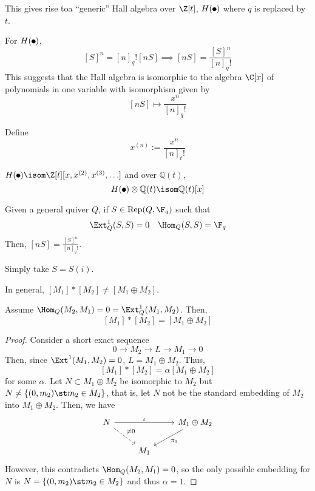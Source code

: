 \documentclass[11pt,leqno,oneside]{amsbook}
\numberwithin{thm}{section}
\newcommand{\Rep}{\operatorname{Rep}} %
\renewcommand{\Q}{Q} %
\newcommand{\bbQ}{\mathbb{Q}} %
\begin{document}
\begin{rmk}
  This gives rise toa ``generic'' Hall algebra over \(\Z[t]\), \(H(\tikz\draw[black,fill=black] (0,0) circle
  (.5ex);)\) where \(q\) is replaced by \(t\).
\end{rmk}
\begin{prop}
   For \(H(\tikz\draw[black,fill=black] (0,0) circle
  (.5ex);)\), \[
    [S]^n = [n]_q! [nS] \implies [nS] = \frac{[S]^n}{[n]_q!}
  \]
  This suggests that the Hall algebra is isomorphic to the algebra
  \(\C[x]\) of polynomials in one variable with isomorphism given
  by \[
    [nS] \mapsto \frac{x^n}{[n]_q!}
  \]
\end{prop}
\begin{defn}
  Define \[
    x^{(n)} := \frac{x^n}{[n]_t!}
  \]
\end{defn}
\begin{prop}
  \(H(\tikz\draw[black,fill=black] (0,0) circle
  (.5ex);) \isom \Z[t][x,x^{(2)},x^{(3)},\ldots]\) and over
  \(\bbQ(t)\), \[
    H(\tikz\draw[black,fill=black] (0,0) circle
  (.5ex);) \otimes \bbQ(t) \isom \bbQ(t)[x]
  \]
\end{prop}
\begin{prop}
  Given a general quiver \(\Q\), if \(S \in \Rep(\Q,\F_q)\) such
  that \[
    \Ext_\Q^1(S,S) = 0 \ \ \ \Hom_\Q(S,S) = \F_q
  \]
  Then, \([nS] = \frac{[S]^n}{[n]_q!}\).
\end{prop}
\begin{example}
  Simply take \(S = S(i)\).
\end{example}
\begin{rmk}
  In general, \([M_1] * [M_2] \neq [M_1 \oplus M_2]\).
\end{rmk}
\begin{prop}\label{mult-commutes-with-oplus}
  Assume \(\Hom_\Q(M_2, M_1) = 0 = \Ext_\Q^1(M_1,M_2)\). Then, \[
    [M_1] * [M_2] = [M_1 \oplus M_2]
  \]
\end{prop}
\begin{proof}
  Consider a short exact sequence \[
    0 \to M_2 \to L \to M_1 \to 0
  \]
  Then, since \(\Ext^1(M_1,M_2) = 0\), \(L = M_1 \oplus
  M_2\). Thus, \[
    [M_1]*[M_2] = \alpha [M_1 \oplus M_2]
  \]
  for some \(\alpha\). Let \(N \subset M_1 \oplus M_2\) be isomorphic
  to \(M_2\) but \(N \neq \{(0,m_2) \st m_2 \in M_2\}\), that is, let
  \(N\) not be the standard embedding of \(M_2\) into \(M_1 \oplus
  M_2\). Then, we have \[
    \begin{tikzcd}
      N  \ar[dr, dashed, "\neq 0"] \ar[rr,"\iota"]& & M_1 \oplus M_2
      \ar[dl, "\pi_1"] \\ 
      & M_1 &
    \end{tikzcd}
  \]
  However, this contradicts \(\Hom_Q(M_2, M_1) = 0\), so the only
  possible embedding for \(N\) is \(N = \{(0,m_2) \st m_2 \in
  M_2\}\) and thus \(\alpha = 1\).
\end{proof}
\end{document}

